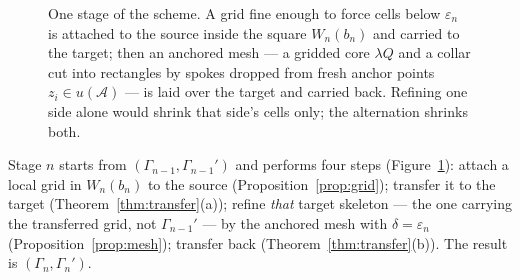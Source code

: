\documentclass[11pt,a4paper]{article}
\theoremstyle{jsplain}
\theoremstyle{jsdefn}
\begin{document}
\begin{figure}[t]
\caption{One stage of the scheme. A grid fine enough to force cells
below $\varepsilon_n$ is attached to the source inside the square
$W_n(b_n)$ and carried to the target; then an anchored mesh --- a
gridded core $\lambda Q$ and a collar cut into rectangles by spokes
dropped from fresh anchor points $z_i\in u(\mathcal A)$ --- is laid over the
target and carried back. Refining one side alone would shrink that
side's cells only; the alternation shrinks
both.}\label{fig:stage}
\end{figure}

Stage $n$ starts from $(\Gamma_{n-1},\Gamma_{n-1}')$ and performs four
steps (Figure~\ref{fig:stage}): attach a local grid in $W_n(b_n)$ to the source
(Proposition~\ref{prop:grid}); transfer it to the target
(Theorem~\ref{thm:transfer}(a)); refine \emph{that} target skeleton ---
the one carrying the transferred grid, not $\Gamma_{n-1}'$ --- by the
anchored mesh with $\delta=\varepsilon_n$
(Proposition~\ref{prop:mesh}); transfer back
(Theorem~\ref{thm:transfer}(b)). The result is
$(\Gamma_n,\Gamma_n')$.
\end{document}
